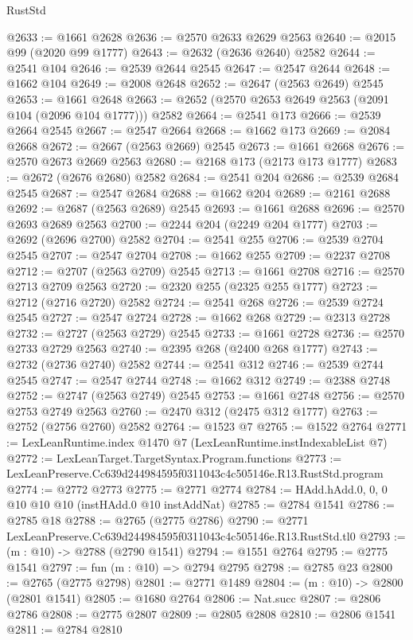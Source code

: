 \begin{lexlean}{RustStd}
\begin{coremodule}
@2633 := @1661 @2628
@2636 := @2570 @2633 @2629 @2563
@2640 := @2015 @99 (@2020 @99 @1777)
@2643 := @2632 (@2636 @2640) @2582
@2644 := @2541 @104
@2646 := @2539 @2644 @2545
@2647 := @2547 @2644
@2648 := @1662 @104
@2649 := @2008 @2648
@2652 := @2647 (@2563 @2649) @2545
@2653 := @1661 @2648
@2663 := @2652 (@2570 @2653 @2649 @2563 (@2091 @104 (@2096 @104 @1777))) @2582
@2664 := @2541 @173
@2666 := @2539 @2664 @2545
@2667 := @2547 @2664
@2668 := @1662 @173
@2669 := @2084 @2668
@2672 := @2667 (@2563 @2669) @2545
@2673 := @1661 @2668
@2676 := @2570 @2673 @2669 @2563
@2680 := @2168 @173 (@2173 @173 @1777)
@2683 := @2672 (@2676 @2680) @2582
@2684 := @2541 @204
@2686 := @2539 @2684 @2545
@2687 := @2547 @2684
@2688 := @1662 @204
@2689 := @2161 @2688
@2692 := @2687 (@2563 @2689) @2545
@2693 := @1661 @2688
@2696 := @2570 @2693 @2689 @2563
@2700 := @2244 @204 (@2249 @204 @1777)
@2703 := @2692 (@2696 @2700) @2582
@2704 := @2541 @255
@2706 := @2539 @2704 @2545
@2707 := @2547 @2704
@2708 := @1662 @255
@2709 := @2237 @2708
@2712 := @2707 (@2563 @2709) @2545
@2713 := @1661 @2708
@2716 := @2570 @2713 @2709 @2563
@2720 := @2320 @255 (@2325 @255 @1777)
@2723 := @2712 (@2716 @2720) @2582
@2724 := @2541 @268
@2726 := @2539 @2724 @2545
@2727 := @2547 @2724
@2728 := @1662 @268
@2729 := @2313 @2728
@2732 := @2727 (@2563 @2729) @2545
@2733 := @1661 @2728
@2736 := @2570 @2733 @2729 @2563
@2740 := @2395 @268 (@2400 @268 @1777)
@2743 := @2732 (@2736 @2740) @2582
@2744 := @2541 @312
@2746 := @2539 @2744 @2545
@2747 := @2547 @2744
@2748 := @1662 @312
@2749 := @2388 @2748
@2752 := @2747 (@2563 @2749) @2545
@2753 := @1661 @2748
@2756 := @2570 @2753 @2749 @2563
@2760 := @2470 @312 (@2475 @312 @1777)
@2763 := @2752 (@2756 @2760) @2582
@2764 := @1523 @7
@2765 := @1522 @2764
@2771 := LexLeanRuntime.index @1470 @7 (LexLeanRuntime.instIndexableList @7)
@2772 := LexLeanTarget.TargetSyntax.Program.functions
@2773 := LexLeanPreserve.Cc639d244984595f0311043c4c505146e.R13.RustStd.program
@2774 := @2772 @2773
@2775 := @2771 @2774
@2784 := HAdd.hAdd.{0, 0, 0} @10 @10 @10 (instHAdd.{0} @10 instAddNat)
@2785 := @2784 @1541
@2786 := @2785 @18
@2788 := @2765 (@2775 @2786)
@2790 := @2771 LexLeanPreserve.Cc639d244984595f0311043c4c505146e.R13.RustStd.tl0
@2793 := (m : @10) -> @2788 (@2790 @1541)
@2794 := @1551 @2764
@2795 := @2775 @1541
@2797 := fun (m : @10) => @2794 @2795
@2798 := @2785 @23
@2800 := @2765 (@2775 @2798)
@2801 := @2771 @1489
@2804 := (m : @10) -> @2800 (@2801 @1541)
@2805 := @1680 @2764
@2806 := Nat.succ
@2807 := @2806 @2786
@2808 := @2775 @2807
@2809 := @2805 @2808
@2810 := @2806 @1541
@2811 := @2784 @2810

\end{coremodule}
\end{lexlean}
